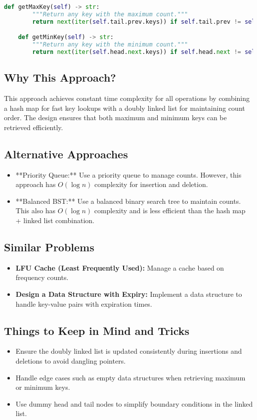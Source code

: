 \begin{fullwidth}
\begin{lstlisting}[language=Python]
    def getMaxKey(self) -> str:
        """Return any key with the maximum count."""
        return next(iter(self.tail.prev.keys)) if self.tail.prev != self.head else ""

    def getMinKey(self) -> str:
        """Return any key with the minimum count."""
        return next(iter(self.head.next.keys)) if self.head.next != self.tail else ""
\end{lstlisting}
\end{fullwidth}

\subsection*{Why This Approach?}
This approach achieves constant time complexity for all operations by combining a hash map for fast key lookups with a doubly linked list for maintaining count order. The design ensures that both maximum and minimum keys can be retrieved efficiently.

\subsection*{Alternative Approaches}
\begin{itemize}
    \item **Priority Queue:** Use a priority queue to manage counts. However, this approach has \(O(\log n)\) complexity for insertion and deletion.
    \item **Balanced BST:** Use a balanced binary search tree to maintain counts. This also has \(O(\log n)\) complexity and is less efficient than the hash map + linked list combination.
\end{itemize}

\subsection*{Similar Problems}
\begin{itemize}
    \item \textbf{LFU Cache (Least Frequently Used):} Manage a cache based on frequency counts.
    \item \textbf{Design a Data Structure with Expiry:} Implement a data structure to handle key-value pairs with expiration times.
\end{itemize}

\subsection*{Things to Keep in Mind and Tricks}
\begin{itemize}
    \item Ensure the doubly linked list is updated consistently during insertions and deletions to avoid dangling pointers.
    \item Handle edge cases such as empty data structures when retrieving maximum or minimum keys.
    \item Use dummy head and tail nodes to simplify boundary conditions in the linked list.
\end{itemize}

